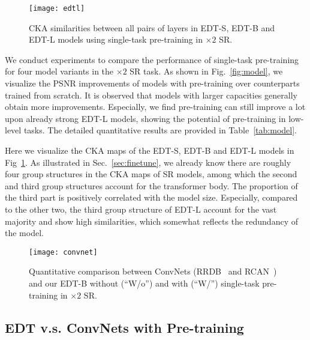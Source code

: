 \documentclass[runningheads]{llncs}
\begin{document}
	\begin{figure}[t]
		\begin{center}
			\texttt{[image: edtl]}
		\end{center}
		\vspace{-0.15in}
		\caption{CKA similarities between all pairs of layers in EDT-S, EDT-B and EDT-L models using single-task pre-training in $\times 2$ SR.}
		\label{fig:edtl}
\end{figure}
	
We conduct experiments to compare the performance of single-task pre-training for four model variants in the $\times 2$ SR task. As shown in Fig.~\ref{fig:model}, we visualize the PSNR improvements of models with pre-training over counterparts trained from scratch. It is observed that models with larger capacities generally obtain more improvements. Especially, we find pre-training can still improve a lot upon already strong EDT-L models, showing the potential of pre-training in low-level tasks. The detailed quantitative results are provided in Table~\ref{tab:model}.
	
	Here we visualize the CKA maps of the EDT-S, EDT-B and EDT-L models in Fig~\ref{fig:edtl}. As illustrated in Sec.~\ref{sec:finetune}, we already know there are roughly four group structures in the CKA maps of SR models, among which the second and third group structures account for the transformer body. The proportion of the third part is positively correlated with the model size. Especially, compared to the other two, the third group structure of EDT-L account for the vast majority and show high similarities, which somewhat reflects the redundancy of the model.
	


	\begin{figure}[t]
		\begin{center}
			\texttt{[image: convnet]}
		\end{center}
		\vspace{-0.1in}
		\caption{Quantitative comparison between ConvNets (RRDB~\cite{wang2018esrgan} and RCAN~\cite{zhang2018image}) and our EDT-B without (``W/o'') and with (``W/'') single-task pre-training in $\times 2$ SR.}
		\label{fig:convnet}
		\vspace{-0.1in}
	\end{figure}
	
	\subsection{EDT v.s. ConvNets with Pre-training}
	
\end{document}
